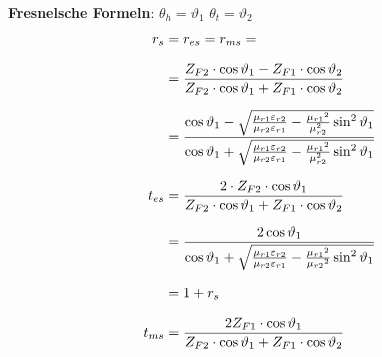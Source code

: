 \textbf{Fresnelsche Formeln}: \qquad $ \theta_h = \vartheta_{1} $ \quad $ \theta_t = \vartheta_{2} $
\begin{equation*}
	\setlength{\jot}{10pt}
	\begin{aligned}
		r_s    & =  r_{es} = r_{ms} =                                                                                                                                                                                                                                                                                   \\
		       & = \frac{Z_{F2} \cdot \cos \vartheta_1-Z_{F1} \cdot \cos \vartheta_2}{Z_{F2} \cdot \cos \vartheta_1+Z_{F1} \cdot \cos \vartheta_2}                                                                                                                                                                      \\
		       & =\frac{\cos \vartheta_1-\sqrt{\frac{\mu_{r 1} \varepsilon_{r 2}}{\mu_{r 2} \varepsilon_{r 1}}-\frac{\mu_{r 1}{ }^2}{\mu_{r 2}^2} \sin ^2 \vartheta_1}}{\cos \vartheta_1+\sqrt{\frac{\mu_{r 1} \varepsilon_{r 2}}{\mu_{r 2} \varepsilon_{r 1}}-\frac{\mu_{r 1}{ }^2}{\mu_{r 2}^2} \sin ^2 \vartheta_1}} \\
		t_{es} & =\frac{2 \cdot	 Z_{F2} \cdot \cos \vartheta_1}{Z_{F2} \cdot \cos \vartheta_1+Z_{F1} \cdot \cos \vartheta_2}                                                                                                                                                                                            \\
		       & =\frac{2 \cos \vartheta_1}{\cos \vartheta_1+\sqrt{\frac{\mu_{r 1} \varepsilon_{r 2}}{\mu_{r 2} \varepsilon_{r 1}}-\frac{\mu_{r 1}{ }^2}{\mu_{r 2}{ }^2} \sin ^2 \vartheta_1}}                                                                                                                          \\
		       & = 1+r_s                                                                                                                                                                                                                                                                                                \\
		t_{ms} & = \frac{2 Z_{F1} \cdot \cos \vartheta_1}{Z_{F2} \cdot \cos \vartheta_1+Z_{F1} \cdot \cos \vartheta_2}                                                                                                                                                                                                  \\

\end{aligned}
\end{equation*}

